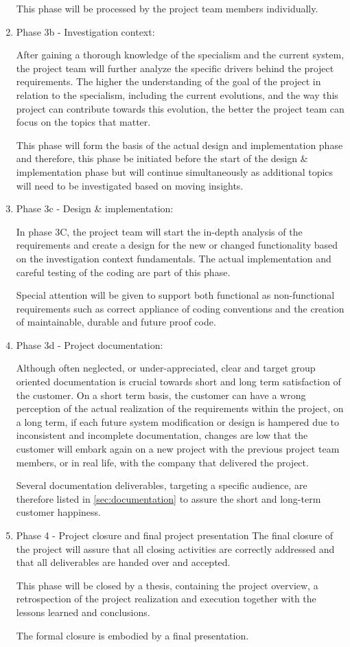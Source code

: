 \begin{enumerate}
		This phase will be processed by the project team members individually.
 	\item Phase 3b - Investigation context: 

		After gaining a thorough knowledge of the specialism and the current system, the project team will further analyze the specific drivers behind the project requirements.
		The higher the understanding of the goal of the project in relation to the specialism, including the current evolutions, and the way this project can contribute towards this evolution, the better the project team can focus on the topics that matter.
	
		This phase will form the basis of the actual design and implementation phase and therefore, this phase be initiated before the start of the design \& implementation phase but will continue simultaneously as additional  topics will need to be investigated based on moving insights. 

 	\item Phase 3c - Design \& implementation: 

	In phase 3C, the project team will start the in-depth analysis of the requirements and create a design for the new or changed functionality based on the investigation context fundamentals.
	The actual implementation and careful testing of the coding are part of this phase. 

	Special attention will be given to support both functional as non-functional requirements such as correct appliance of coding conventions and the creation of maintainable, durable and future proof code.

 	\item Phase 3d - Project documentation:

	Although often neglected, or under-appreciated, clear and target group oriented documentation is crucial towards short and long term satisfaction of the customer.
	On a short term basis, the customer can have a wrong perception of the actual realization of the requirements within the project, on a long term, if each future system modification or design is hampered due to inconsistent and incomplete documentation, changes are low that the customer will embark again on a new project with the previous project team members, or in real life, with the company that delivered the project.

	Several documentation deliverables, targeting a specific audience, are therefore listed in \autoref{sec:documentation} to assure the short and long-term customer happiness.

	\item Phase 4 - Project closure and final project presentation
	The final closure of the project will assure that all closing activities are correctly addressed and that all deliverables are handed over and accepted.

	This phase will be closed by a thesis, containing the project overview, a retrospection of the project realization and execution together with the lessons learned and conclusions.

	The formal closure is embodied by a final presentation.
\end {enumerate}

